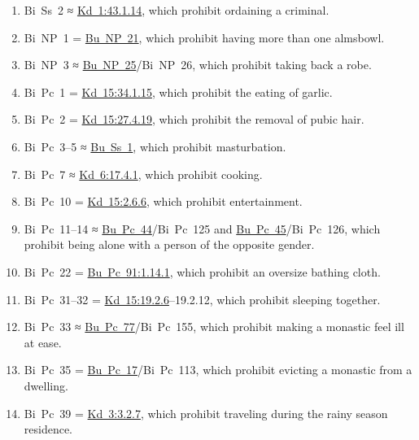 \documentclass[12pt,openany]{book}%
\begin{document}
\begin{enumerate}%
\item Bi Ss 2 ≈ \href{https://suttacentral.net/pli-tv-kd1/en/brahmali\#43.1.14}{Kd~1:43.1.14}, which prohibit ordaining a criminal.%
\item Bi NP 1 = \href{https://suttacentral.net/pli-tv-bu-vb-np21/en/brahmali\#2.17.1}{Bu~NP~21}, which prohibit having more than one almsbowl.%
\item Bi NP 3 ≈ \href{https://suttacentral.net/pli-tv-bu-vb-np25/en/brahmali\#1.27.1}{Bu~NP~25}/Bi NP 26, which prohibit taking back a robe.%
\item Bi Pc 1 = \href{https://suttacentral.net/pli-tv-kd15/en/brahmali\#34.1.15}{Kd~15:34.1.15}, which prohibit the eating of garlic.%
\item Bi Pc 2 = \href{https://suttacentral.net/pli-tv-kd15/en/brahmali\#27.4.19}{Kd~15:27.4.19}, which prohibit the removal of pubic hair.%
\item Bi Pc 3–5 ≈ \href{https://suttacentral.net/pli-tv-bu-vb-ss1/en/brahmali\#2.1.13.1}{Bu~Ss~1}, which prohibit masturbation.%
\item Bi Pc 7 ≈ \href{https://suttacentral.net/pli-tv-kd6/en/brahmali\#17.4.1}{Kd~6:17.4.1}, which prohibit cooking.%
\item Bi Pc 10 = \href{https://suttacentral.net/pli-tv-kd15/en/brahmali\#2.6.6}{Kd~15:2.6.6}, which prohibit entertainment.%
\item Bi Pc 11–14 ≈ \href{https://suttacentral.net/pli-tv-bu-vb-pc44/en/brahmali\#1.14.1}{Bu~Pc~44}/Bi Pc 125 and \href{https://suttacentral.net/pli-tv-bu-vb-pc45/en/brahmali\#1.14.1}{Bu~Pc~45}/Bi Pc 126, which prohibit being alone with a person of the opposite gender.%
\item Bi Pc 22 = \href{https://suttacentral.net/pli-tv-bu-vb-pc91/en/brahmali\#1.14.1}{Bu~Pc~91:1.14.1}, which prohibit an oversize bathing cloth.%
\item Bi Pc 31–32 = \href{https://suttacentral.net/pli-tv-kd15/en/brahmali\#19.2.6}{Kd~15:19.2.6}–19.2.12, which prohibit sleeping together.%
\item Bi Pc 33 ≈ \href{https://suttacentral.net/pli-tv-bu-vb-pc77/en/brahmali\#1.19.1}{Bu~Pc~77}/Bi Pc 155, which prohibit making a monastic feel ill at ease.%
\item Bi Pc 35 = \href{https://suttacentral.net/pli-tv-bu-vb-pc17/en/brahmali\#1.31.1}{Bu~Pc~17}/Bi Pc 113, which prohibit evicting a monastic from a dwelling.%
\item Bi Pc 39 = \href{https://suttacentral.net/pli-tv-kd3/en/brahmali\#3.2.7}{Kd~3:3.2.7}, which prohibit traveling during the rainy season residence.%

\end{enumerate}
\end{document}
